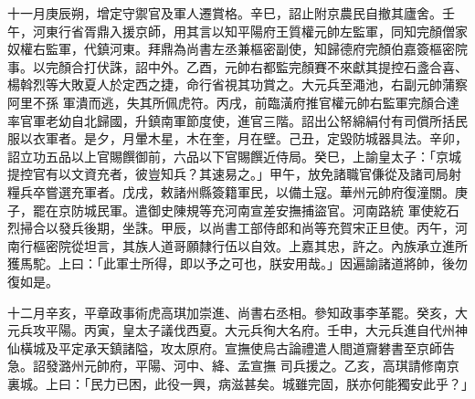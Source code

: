 \begin{pinyinscope}
 十一月庚辰朔，增定守禦官及軍人遷賞格。辛巳，詔止附京農民自撤其廬舍。壬午，河東行省胥鼎入援京師，用其言以知平陽府王質權元帥左監軍，同知完顏僧家奴權右監軍，代鎮河東。拜鼎為尚書左丞兼樞密副使，知歸德府完顏伯嘉簽樞密院事。以完顏合打伏誅，詔中外。乙酉，元帥右都監完顏賽不來獻其提控石盞合喜、楊斡烈等大敗夏人於定西之捷，命行省視其功賞之。大元兵至澠池，右副元帥蒲察阿里不孫
 軍潰而逃，失其所佩虎符。丙戌，前臨潢府推官權元帥右監軍完顏合達率官軍老幼自北歸國，升鎮南軍節度使，進官三階。詔出公帑綿絹付有司償所括民服以衣軍者。是夕，月暈木星，木在奎，月在壁。己丑，定毀防城器具法。辛卯，詔立功五品以上官賜饌御前，六品以下官賜饌近侍局。癸巳，上諭皇太子：「京城提控官有以文資充者，彼豈知兵？其速易之。」甲午，放免諸職官傔從及諸司局射糧兵卒嘗選充軍者。戊戌，敕諸州縣簽籍軍民，以備土寇。華州元帥府復潼關。庚子，罷在京防城民軍。遣御史陳規等充河南宣差安撫捕盜官。河南路統
 軍使紇石烈掃合以發兵後期，坐誅。甲辰，以尚書工部侍郎和尚等充賀宋正旦使。丙午，河南行樞密院從坦言，其族人道哥願隸行伍以自效。上嘉其忠，許之。內族承立進所獲馬駝。上曰：「此軍士所得，即以予之可也，朕安用哉。」因遍諭諸道將帥，後勿復如是。



 十二月辛亥，平章政事術虎高琪加崇進、尚書右丞相。參知政事李革罷。癸亥，大元兵攻平陽。丙寅，皇太子議伐西夏。大元兵徇大名府。壬申，大元兵進自代州神仙橫城及平定承天鎮諸隘，攻太原府。宣撫使烏古論禮遣人間道齎礬書至京師告急。詔發潞州元帥府，平陽、河中、絳、孟宣撫
 司兵援之。乙亥，高琪請修南京裏城。上曰：「民力已困，此役一興，病滋甚矣。城雖完固，朕亦何能獨安此乎？」



\end{pinyinscope}